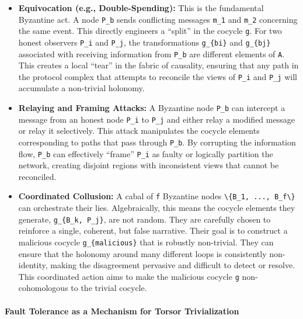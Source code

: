 \documentclass[
]{article}
\begin{document}
\begin{itemize}
\item
  \textbf{Equivocation (e.g., Double-Spending):} This is the fundamental
  Byzantine act. A node \texttt{P\_b} sends conflicting messages
  \texttt{m\_1} and \texttt{m\_2} concerning the same event. This
  directly engineers a ``split'' in the cocycle \texttt{g}. For two
  honest observers \texttt{P\_i} and \texttt{P\_j}, the transformations
  \texttt{g\_\{bi\}} and \texttt{g\_\{bj\}} associated with receiving
  information from \texttt{P\_b} are different elements of \texttt{A}.
  This creates a local ``tear'' in the fabric of causality, ensuring
  that any path in the protocol complex that attempts to reconcile the
  views of \texttt{P\_i} and \texttt{P\_j} will accumulate a non-trivial
  holonomy.
\item
  \textbf{Relaying and Framing Attacks:} A Byzantine node \texttt{P\_b}
  can intercept a message from an honest node \texttt{P\_i} to
  \texttt{P\_j} and either relay a modified message or relay it
  selectively. This attack manipulates the cocycle elements
  corresponding to paths that pass through \texttt{P\_b}. By corrupting
  the information flow, \texttt{P\_b} can effectively ``frame''
  \texttt{P\_i} as faulty or logically partition the network, creating
  disjoint regions with inconsistent views that cannot be reconciled.
\item
  \textbf{Coordinated Collusion:} A cabal of \texttt{f} Byzantine nodes
  \texttt{\textbackslash{}\{B\_1,\ ...,\ B\_f\textbackslash{}\}} can
  orchestrate their lies. Algebraically, this means the cocycle elements
  they generate, \texttt{g\_\{B\_k,\ P\_j\}}, are not random. They are
  carefully chosen to reinforce a single, coherent, but false narrative.
  Their goal is to construct a malicious cocycle
  \texttt{g\_\{malicious\}} that is robustly non-trivial. They can
  ensure that the holonomy around many different loops is consistently
  non-identity, making the disagreement pervasive and difficult to
  detect or resolve. This coordinated action aims to make the malicious
  cocycle \texttt{g} non-cohomologous to the trivial cocycle.
\end{itemize}

\paragraph{Fault Tolerance as a Mechanism for Torsor
Trivialization}\label{fault-tolerance-as-a-mechanism-for-torsor-trivialization}
\end{document}
